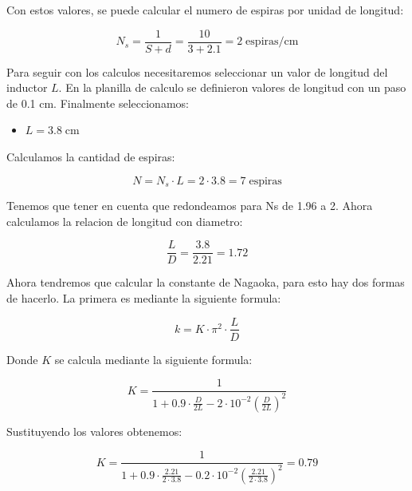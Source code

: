 Con estos valores, se puede calcular el numero de espiras por unidad de longitud:

\begin{equation}
    N_s = \frac{1}{S + d} = \frac{10}{3 + 2.1 } = 2\; \text{espiras/cm}
\end{equation}

Para seguir con los calculos necesitaremos seleccionar un valor de longitud del inductor $L$. En la planilla de calculo se definieron valores de longitud con un paso de 0.1 cm.
Finalmente seleccionamos:

\begin{itemize}
    \item $L = 3.8\; \text{cm}$
\end{itemize}

Calculamos la cantidad de espiras:

\begin{equation}
    N = N_s \cdot L = 2 \cdot 3.8 = 7\; \text{espiras} 
\end{equation}

Tenemos que tener en cuenta que redondeamos para Ns de 1.96 a 2. Ahora calculamos la relacion de longitud con diametro:

\begin{equation}
    \frac{L}{D} = \frac{3.8}{2.21} = 1.72
\end{equation}

Ahora tendremos que calcular la constante de Nagaoka, para esto hay dos formas de hacerlo. La primera es mediante la siguiente formula:

\begin{equation}
    k = K \cdot \pi^2 \cdot \frac{L}{D} 
\end{equation}

Donde $K$ se calcula mediante la siguiente formula:

\begin{equation}
    K = \frac{1}{1 + 0.9 \cdot \frac{D}{2L} - 2 \cdot 10^{-2} \left(\frac{D}{2L}\right)^2}
\end{equation}

Sustituyendo los valores obtenemos:

\begin{equation}
    K = \frac{1}{1 + 0.9 \cdot \frac{2.21}{2 \cdot 3.8} - 0.2 \cdot 10^{-2} \left(\frac{2.21}{2 \cdot 3.8}\right)^2} = 0.79
\end{equation}

